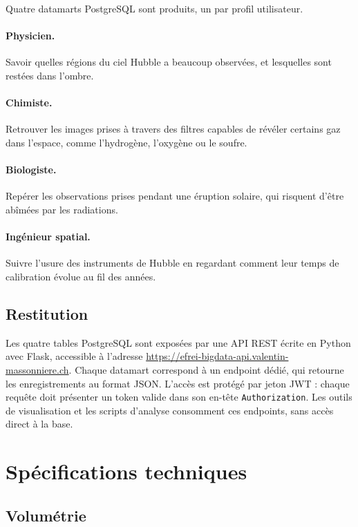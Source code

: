 \documentclass[11pt,a4paper]{article}
\begin{document}
Quatre datamarts PostgreSQL sont produits, un par profil utilisateur.

\paragraph{Physicien.} Savoir quelles régions du ciel Hubble a beaucoup observées, et lesquelles sont restées dans l'ombre.

\paragraph{Chimiste.} Retrouver les images prises à travers des filtres capables de révéler certains gaz dans l'espace, comme l'hydrogène, l'oxygène ou le soufre.

\paragraph{Biologiste.} Repérer les observations prises pendant une éruption solaire, qui risquent d'être abîmées par les radiations.

\paragraph{Ingénieur spatial.} Suivre l'usure des instruments de Hubble en regardant comment leur temps de calibration évolue au fil des années.

\subsection{Restitution}

Les quatre tables PostgreSQL sont exposées par une API REST écrite en Python avec Flask, accessible à l'adresse \href{https://efrei-bigdata-api.valentin-massonniere.ch}{https://efrei-bigdata-api.valentin-massonniere.ch}. Chaque datamart correspond à un endpoint dédié, qui retourne les enregistrements au format JSON. L'accès est protégé par jeton JWT : chaque requête doit présenter un token valide dans son en-tête \texttt{Authorization}. Les outils de visualisation et les scripts d'analyse consomment ces endpoints, sans accès direct à la base.

\newpage
\section{Spécifications techniques}

\subsection{Volumétrie}
\end{document}
